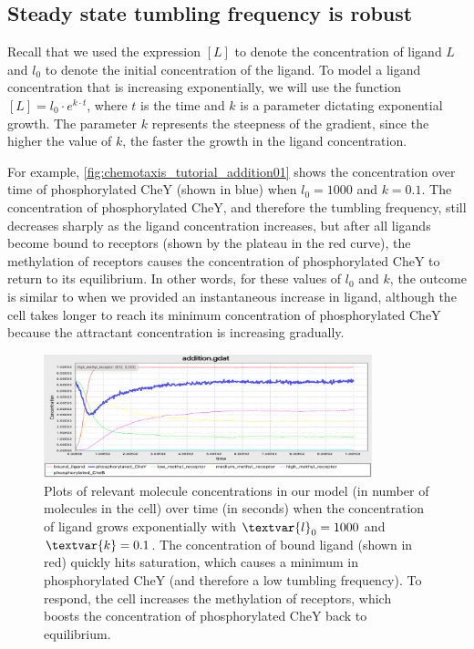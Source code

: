 \subsection{Steady state tumbling frequency is robust}

Recall that we used the expression $[L]$ to denote the concentration of ligand $L$ and $l_0$ to denote the initial concentration of the ligand. To model a ligand concentration that is increasing exponentially, we will use the function $[L] = l_0 \cdot e^{k \cdot t}$, where $t$ is the time and $k$ is a parameter dictating exponential growth. The parameter $k$ represents the steepness of the gradient, since the higher the value of $k$, the faster the growth in the ligand concentration.

For example, \autoref{fig:chemotaxis_tutorial_addition01} shows the concentration over time of phosphorylated CheY (shown in blue) when $l_0 = 1000$ and $k = 0.1$. The concentration of phosphorylated CheY, and therefore the tumbling frequency, still decreases sharply as the ligand concentration increases, but after all ligands become bound to receptors (shown by the plateau in the red curve), the methylation of receptors causes the concentration of phosphorylated CheY to return to its equilibrium. In other words, for these values of $l_0$ and $k$, the outcome is similar to when we provided an instantaneous increase in ligand, although the cell takes longer to reach its minimum concentration of phosphorylated CheY because the attractant concentration is increasing gradually.\\

\begin{figure}[h]
\centering
\mySfFamily
\includegraphics[width = 0.85\textwidth]{../images/chemotaxis_tutorial_addition01.png}
\caption{Plots of relevant molecule concentrations in our model (in number of molecules in the cell) over time (in seconds) when the concentration of ligand grows exponentially with $\textvar{l}_\text{0} = \text{1000}$ and $\textvar{k} = \text{0.1}$. The concentration of bound ligand (shown in red) quickly hits saturation, which causes a minimum in phosphorylated CheY (and therefore a low tumbling frequency). To respond, the cell increases the methylation of receptors, which boosts the concentration of phosphorylated CheY back to equilibrium.}
\label{fig:chemotaxis_tutorial_addition01}
\end{figure}


